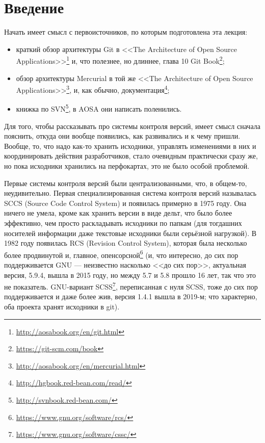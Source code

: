 \documentclass{../../text-style}
\begin{document}
\maketitle
\thispagestyle{empty}

\section{Введение}

Начать имеет смысл с первоисточников, по которым подготовлена эта лекция:
\begin{itemize}
    \item краткий обзор архитектуры Git в <<The Architecture of Open Source Applications>>\footnote{\url{http://aosabook.org/en/git.html}} и, что полезнее, но длиннее, глава 10 Git Book\footnote{\url{https://git-scm.com/book}};
    \item обзор архитектуры Mercurial в той же <<The Architecture of Open Source Applications>>\footnote{\url{http://aosabook.org/en/mercurial.html}}, и, как обычно, документация\footnote{\url{http://hgbook.red-bean.com/read/}};
    \item книжка по SVN\footnote{\url{http://svnbook.red-bean.com/}}, в AOSA они написать поленились.
\end{itemize}

Для того, чтобы рассказывать про системы контроля версий, имеет смысл сначала пояснить, откуда они вообще появились, как развивались и к чему пришли. Вообще, то, что надо как-то хранить исходники, управлять изменениями в них и координировать действия разработчиков, стало очевидным практически сразу же, но пока исходники хранились на перфокартах, это не было особой проблемой.

Первые системы контроля версий были централизованными, что, в общем-то, неудивительно. Первая специализированная система контроля версий называлась SCCS (Source Code Control System) и появилась примерно в 1975 году. Она ничего не умела, кроме как хранить версии в виде дельт, что было более эффективно, чем просто раскладывать исходники по папкам (для тогдашних носителей информации даже текстовые исходники были серьёзной нагрузкой). В 1982 году появилась RCS (Revision Control System), которая была несколько более продвинутой и, главное, опенсорсной\footnote{\url{https://www.gnu.org/software/rcs/}} (и, что интересно, до сих пор поддерживается GNU --- неизвестно насколько <<до сих пор>>, актуальная версия, 5.9.4, вышла в 2015 году, но между 5.7 и 5.8 прошло 16 лет, так что это не показатель. GNU-вариант SCSS\footnote{\url{https://www.gnu.org/software/cssc/}}, переписанная с нуля SCSS, тоже до сих пор поддерживается и даже более жив, версия 1.4.1 вышла в 2019-м; что характерно, оба проекта хранят исходники в git).
\end{document}
